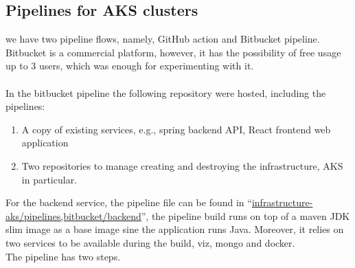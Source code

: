 \subsection{Pipelines for AKS clusters}\label{subsec:Pipelines:AKSCluster}
we have two pipeline flows, namely, GitHub action and Bitbucket pipeline.\\
Bitbucket is a commercial platform, however, it has the possibility of free usage up to 3 users, which was enough for experimenting with it.
\\\\
In the bitbucket pipeline the following repository were hosted, including the pipelines:
\begin{enumerate}
    \item A copy of existing services, e.g., spring backend API, React frontend web application
    \item Two repositories to manage creating and destroying the infrastructure, AKS in particular.
\end{enumerate}
For the backend service, the pipeline file can be found in “\url{infrastructure-aks/pipelines,bitbucket/backend}”, the pipeline build runs on top of a maven JDK slim image as a base image sine the application runs Java. Moreover, it relies on two services to be available during the build, viz, mongo and docker.
\\
The pipeline has two steps.
